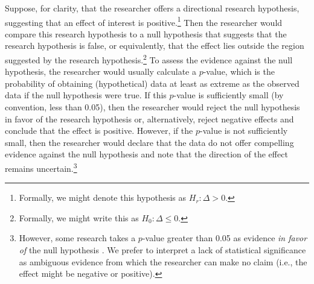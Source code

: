 \documentclass[12pt]{article}
\begin{document}
Suppose, for clarity, that the researcher offers a directional research hypothesis, suggesting that an effect of interest is positive.\footnote{Formally, we might denote this hypothesis as $H_r: \Delta > 0$.} Then the researcher would compare this research hypothesis to a null hypothesis that suggests that the research hypothesis is false, or equivalently, that the effect lies outside the region suggested by the research hypothesis.\footnote{Formally, we might write this as $H_0: \Delta \leq 0$.} To assess the evidence against the null hypothesis, the researcher would usually calculate a $p$-value, which is the probability of obtaining (hypothetical) data at least as extreme as the observed data if the null hypothesis were true. If this $p$-value is sufficiently small (by convention, less than 0.05), then the researcher would reject the null hypothesis in favor of the research hypothesis or, alternatively, reject negative effects and conclude that the effect is positive. However, if the $p$-value is not sufficiently small, then the researcher would declare that the data do not offer compelling evidence against the null hypothesis and note that the direction of the effect remains uncertain.\footnote{However, some research takes a $p$-value greater than 0.05 as evidence \textit{in favor of} the null hypothesis \citep{Rainey2014a}. We prefer to interpret a lack of statistical significance as ambiguous evidence from which the researcher can make no claim (i.e., the effect might be negative or positive).}

\end{document}
